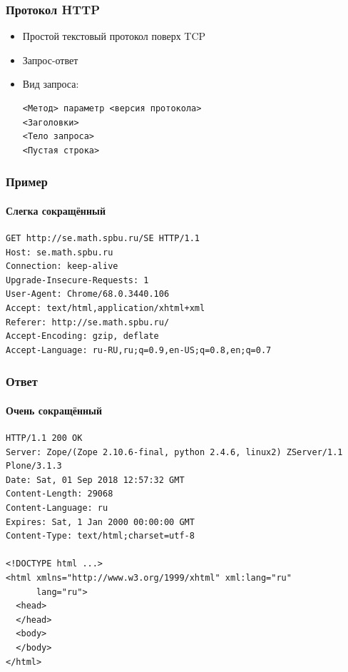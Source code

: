 \documentclass[xetex,mathserif,serif]{beamer}
\begin{document}
    \begin{frame}[fragile]
        \frametitle{Протокол HTTP}
        \begin{itemize}
            \item Простой текстовый протокол поверх TCP
            \item Запрос-ответ
            \item Вид запроса:
            \begin{verbatim}
<Метод> параметр <версия протокола>
<Заголовки>
<Тело запроса>
<Пустая строка>
            \end{verbatim}
        \end{itemize}
    \end{frame}

    \begin{frame}[fragile]
        \frametitle{Пример}
        \framesubtitle{Слегка сокращённый}
        \begin{verbatim}
GET http://se.math.spbu.ru/SE HTTP/1.1
Host: se.math.spbu.ru
Connection: keep-alive
Upgrade-Insecure-Requests: 1
User-Agent: Chrome/68.0.3440.106 
Accept: text/html,application/xhtml+xml
Referer: http://se.math.spbu.ru/
Accept-Encoding: gzip, deflate
Accept-Language: ru-RU,ru;q=0.9,en-US;q=0.8,en;q=0.7

        \end{verbatim}
    \end{frame}

    \begin{frame}[fragile]
        \frametitle{Ответ}
        \framesubtitle{Очень сокращённый}
        \begin{small}
            \begin{verbatim}
HTTP/1.1 200 OK
Server: Zope/(Zope 2.10.6-final, python 2.4.6, linux2) ZServer/1.1 Plone/3.1.3
Date: Sat, 01 Sep 2018 12:57:32 GMT
Content-Length: 29068
Content-Language: ru
Expires: Sat, 1 Jan 2000 00:00:00 GMT
Content-Type: text/html;charset=utf-8

<!DOCTYPE html ...>
<html xmlns="http://www.w3.org/1999/xhtml" xml:lang="ru"
      lang="ru">
  <head>
  </head>
  <body>
  </body>
</html>
            \end{verbatim}
        \end{small}
    \end{frame}
\end{document}
